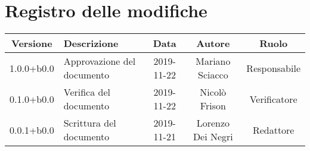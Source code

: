 \section*{Registro delle modifiche}

\begin{center}
	\begin{longtable}{|c|p{3cm}|c|c|c|}
	\hline
	\rowcolor{lighter-grayer}
	\textbf{Versione} & \textbf{Descrizione} & \textbf{Data} & \textbf{Autore} & \textbf{Ruolo} \\
	\hline
	\endfirsthead


	1.0.0+b0.0 & Approvazione del documento & 2019-11-22 & Mariano Sciacco & Responsabile \\
	\hline
	0.1.0+b0.0 & Verifica del documento & 2019-11-22 & Nicolò Frison & Verificatore \\
	\hline
	0.0.1+b0.0 & Scrittura del documento & 2019-11-21 & Lorenzo Dei Negri & Redattore \\
	\hline

	\end{longtable}
\end{center}